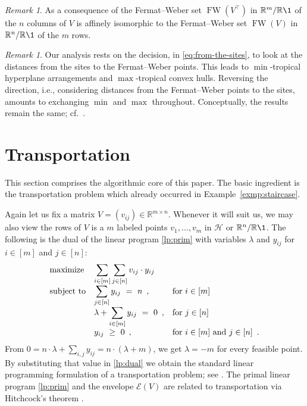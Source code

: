 \documentclass[a4paper,12pt]{amsart}
\newcommand\RR{{\mathbb R}}
\newcommand\cE{{\mathcal E}}
\newcommand\cH{{\mathcal H}}
\newcommand\torus[1]{\RR^{#1}/\RR\1} %
\DeclareMathOperator{\FW}{FW} %
\newcommand\transpose[1]{#1^\top}
\theoremstyle{remark}
\newtheorem{remark}[theorem]{Remark}
\begin{document}
\begin{remark}
  As a consequence of \cite[Theorem~6.14]{ETC} the Fermat--Weber set $\FW(\transpose{V})$ in $\torus{m}$ of the $n$ columns of $V$ is affinely isomorphic to the Fermat--Weber set $\FW(V)$ in $\torus{n}$ of the $m$ rows.
\end{remark}

\begin{remark}
  Our analysis rests on the decision, in \eqref{eq:from-the-sites}, to look at the distances from the sites to the Fermat--Weber points.
  This leads to $\min$-tropical hyperplane arrangements and $\max$-tropical convex hulls.
  Reversing the direction, i.e., considering distances from the Fermat--Weber points to the sites, amounts to exchanging $\min$ and $\max$ throughout.
  Conceptually, the results remain the same; cf.\ \cite[]{ETC}.
\end{remark}

\section{Transportation} \label{sec:transportation}
\noindent
This section comprises the algorithmic core of this paper.
The basic ingredient is the transportation problem which already occurred in Example~\ref{exmp:staircase}.

Again let us fix a matrix $V=(v_{ij})\in\RR^{m\times n}$.
Whenever it will suit us, we may also view the rows of $V$ is a $m$ labeled points $v_1,\dots,v_m$ in $\cH$ or $\torus{n}$.
The following is the dual of the linear program \eqref{lp:prim} with variables $\lambda$ and $y_{ij}$ for $i\in[m]$ and $j\in[n]$:
\begin{equation} \label{lp:dual}
  \begin{array}{ll@{}ll}
    \text{maximize}  & \displaystyle \sum_{i\in[m]}\sum_{j\in[n]}v_{ij}\cdot y_{ij} & \\
    \text{subject to}& \displaystyle \sum_{j\in[n]} y_{ij} \ = \ n \enspace , & \quad \text{for } i\in[m] \\
                     & \displaystyle \lambda + \sum_{i\in[m]} y_{ij} \ = \ 0 \enspace , & \quad \text{for } j\in[n] \\
                     & \displaystyle y_{ij} \ \geq \ 0 \enspace , & \quad \text{for } i\in[m] \text{ and } j\in[n] \enspace .
  \end{array}
\end{equation}
From $0 = n\cdot \lambda + \sum_{i,j}y_{ij} = n\cdot (\lambda + m)$, we get $\lambda=-m$ for every feasible point.
By substituting that value in \eqref{lp:dual} we obtain the standard linear programming formulation of a transportation problem; see \cite[]{Schrijver03:CO_A}.
The primal linear program \eqref{lp:prim} and the envelope $\cE(V)$ are related to transportation via Hitchcock's theorem \cite[Theorem 21.13]{Schrijver03:CO_A}.
\end{document}
